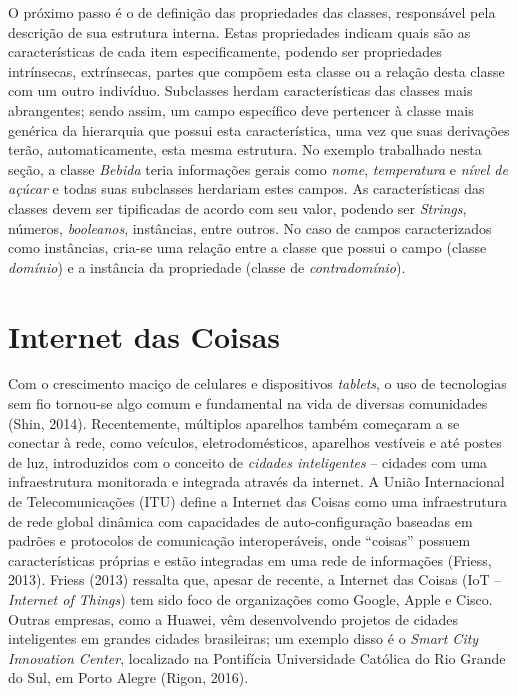 O próximo passo é o de definição das propriedades das classes, responsável pela descrição de sua estrutura interna. Estas propriedades indicam quais são as características de cada item especificamente, podendo ser propriedades intrínsecas, extrínsecas, partes que compõem esta classe ou a relação desta classe com um outro indivíduo. Subclasses herdam características das classes mais abrangentes; sendo assim, um campo específico deve pertencer à classe mais genérica da hierarquia que possui esta característica, uma vez que suas derivações terão, automaticamente, esta mesma estrutura. No exemplo trabalhado nesta seção, a classe \emph{Bebida} teria informações gerais como \emph{nome}, \emph{temperatura} e \emph{nível de açúcar} e todas suas subclasses herdariam estes campos. As características das classes devem ser tipificadas de acordo com seu valor, podendo ser \emph{Strings}, números, \emph{booleanos}, instâncias, entre outros. No caso de campos caracterizados como instâncias, cria-se uma relação entre a classe que possui o campo (classe \emph{domínio}) e a instância da propriedade (classe de \emph{contradomínio}).

\section{Internet das Coisas}
Com o crescimento maciço de celulares e dispositivos \emph{tablets}, o uso de tecnologias sem fio tornou-se algo comum e fundamental na vida de diversas comunidades (Shin, 2014)\nocite{SHIN2014}. Recentemente, múltiplos aparelhos também começaram a se conectar à rede, como veículos, eletrodomésticos, aparelhos vestíveis e até postes de luz, introduzidos com o conceito de \emph{cidades inteligentes} -- cidades com uma infraestrutura monitorada e integrada através da internet. A União Internacional de Telecomunicações (ITU) define a Internet das Coisas como uma infraestrutura de rede global dinâmica com capacidades de auto-configuração baseadas em padrões e protocolos de comunicação interoperáveis, onde “coisas” possuem características próprias e estão integradas em uma rede de informações (Friess, 2013)\nocite{FRIESS2013}. Friess (2013) ressalta que, apesar de recente, a Internet das Coisas (IoT -- \emph{Internet of Things}) tem sido foco de organizações como Google, Apple e Cisco. Outras empresas, como a Huawei, vêm desenvolvendo projetos de cidades inteligentes em grandes cidades brasileiras; um exemplo disso é o \emph{Smart City Innovation Center}, localizado na Pontifícia Universidade Católica do Rio Grande do Sul, em Porto Alegre (Rigon, 2016)\nocite{RIGON2016}.

